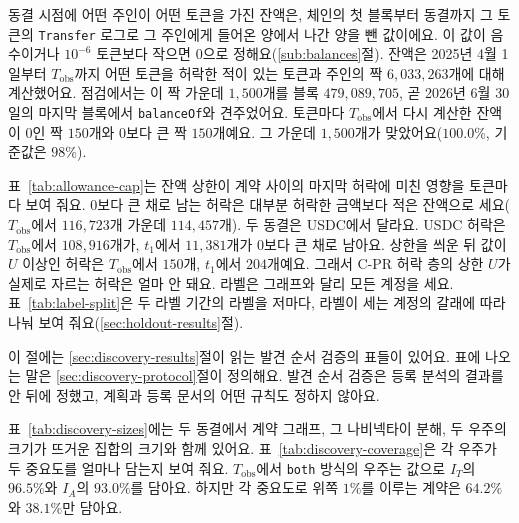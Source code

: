 동결 시점에 어떤 주인이 어떤 토큰을 가진 잔액은, 체인의 첫 블록부터 동결까지 그 토큰의 \texttt{Transfer} 로그로 그 주인에게 들어온 양에서 나간 양을 뺀 값이에요. 이 값이 음수이거나 $10^{-6}$ 토큰보다 작으면 0으로 정해요(\ref{sub:balances}절). 잔액은 2025년 4월 1일부터 $T_{\mathrm{obs}}$까지 어떤 토큰을 허락한 적이 있는 토큰과 주인의 짝 $6{,}033{,}263$개에 대해 계산했어요. 점검에서는 이 짝 가운데 $1{,}500$개를 블록 $479{,}089{,}705$, 곧 2026년 6월 30일의 마지막 블록에서 \texttt{balanceOf}와 견주었어요. 토큰마다 $T_{\mathrm{obs}}$에서 다시 계산한 잔액이 0인 짝 $150$개와 0보다 큰 짝 $150$개예요. 그 가운데 $1{,}500$개가 맞았어요($100.0\%$, 기준값은 $98\%$).

표~\ref{tab:allowance-cap}는 잔액 상한이 계약 사이의 마지막 허락에 미친 영향을 토큰마다 보여 줘요. 0보다 큰 채로 남는 허락은 대부분 허락한 금액보다 적은 잔액으로 세요($T_{\mathrm{obs}}$에서 $116{,}723$개 가운데 $114{,}457$개). 두 동결은 USDC에서 달라요. USDC 허락은 $T_{\mathrm{obs}}$에서 $108{,}916$개가, $t_1$에서 $11{,}381$개가 0보다 큰 채로 남아요. 상한을 씌운 뒤 값이 $U$ 이상인 허락은 $T_{\mathrm{obs}}$에서 $150$개, $t_1$에서 $204$개예요. 그래서 \mbox{C-PR} 허락 층의 상한 $U$가 실제로 자르는 허락은 얼마 안 돼요. 라벨은 그래프와 달리 모든 계정을 세요. 표~\ref{tab:label-split}은 두 라벨 기간의 라벨을 저마다, 라벨이 세는 계정의 갈래에 따라 나눠 보여 줘요(\ref{sec:holdout-results}절).






이 절에는 \ref{sec:discovery-results}절이 읽는 발견 순서 검증의 표들이 있어요. 표에 나오는 말은 \ref{sec:discovery-protocol}절이 정의해요. 발견 순서 검증은 등록 분석의 결과를 안 뒤에 정했고, 계획과 등록 문서의 어떤 규칙도 정하지 않아요.

표~\ref{tab:discovery-sizes}에는 두 동결에서 계약 그래프, 그 나비넥타이 분해, 두 우주의 크기가 뜨거운 집합의 크기와 함께 있어요. 표~\ref{tab:discovery-coverage}은 각 우주가 두 중요도를 얼마나 담는지 보여 줘요. $T_{\mathrm{obs}}$에서 \texttt{both} 방식의 우주는 값으로 $I_T$의 $96.5\%$와 $I_A$의 $93.0\%$를 담아요. 하지만 각 중요도로 위쪽 $1\%$를 이루는 계약은 $64.2\%$와 $38.1\%$만 담아요.





